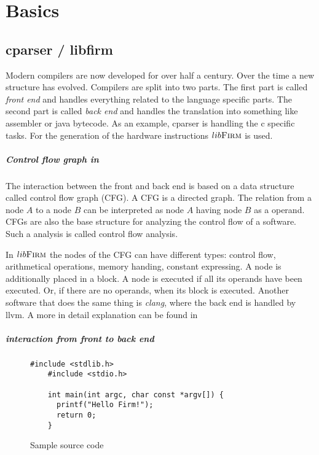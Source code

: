 \chapter{Basics}\label{sec:basics}

\section{cparser / libfirm}
Modern compilers are now developed for over half a century. Over the time a new structure has evolved. Compilers are split into two parts. The first part is called \textit{front end} and handles everything related to the language specific parts. The second part is called \textit{back end} and handles the translation into something like assembler or java bytecode. As an example, cparser is handling the c specific tasks. For the generation of the hardware instructions $lib\textsc{Firm}$ is used.

\paragraph{Control flow graph in \libFIRM} The interaction between the front and back end is based on a data structure called control flow graph (CFG). A CFG is a directed graph. The relation from a node $A$ to a node $B$ can be interpreted as node $A$ having node $B$ as a operand.
CFGs are also the base structure for analyzing the control flow of a software. Such a analysis is called control flow analysis.

In $lib\textsc{Firm}$ the nodes of the CFG can have different types: control flow, arithmetical operations, memory handing, constant expressing. A node is additionally placed in a block. A node is executed if all its operands have been executed. Or, if there are no operands, when its block is executed.
Another software that does the same thing is \textit{clang}, where the back end is handled by llvm.
A more in detail explanation can be found in \cite{libfirm}

\paragraph{interaction from front to back end}

\begin{figure}
	\centering
	\begin{lstlisting}[frame=single]
	#include <stdlib.h>
	#include <stdio.h>
	
	int main(int argc, char const *argv[]) {
	  printf("Hello Firm!");
	  return 0;
	}
	\end{lstlisting} 
	\caption{Sample source code}
	\label{code:workflow:example}
\end{figure}

